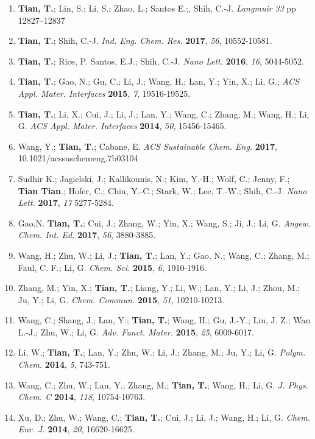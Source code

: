 \documentclass[margin]{res}
\begin{document}
\begin{resume}
\begin{enumerate}
  \item \textbf{Tian, T.}; Lin, S.; Li, S.; Zhao, L.; Santos E.;, Shih,
  C.-J. \textit{Langmuir} \textit{33} pp 12827–12837
  \item \textbf{Tian, T.}; Shih, C.-J. \textit{Ind. Eng. Chem. Res.} \textbf{2017}, \textit{56}, 10552-10581.
  \item \textbf{Tian, T.}; Rice, P. Santos, E.J.; Shih, C.-J. \textit{Nano Lett.} \textbf{2016}, \textit{16}, 5044-5052.
  \item \textbf{Tian, T.}; Gao, N.; Gu, C.; Li, J.; Wang, H.; Lan, Y.; Yin, X.; Li, G.; \textit{ACS Appl. Mater. Interfaces} \textbf{2015}, \textit{7}, 19516-19525.
  \item \textbf{Tian, T.}; Li, X.; Cui, J.; Li, J.; Lan, Y.; Wang, C.; Zhang, M.; Wang, H.; Li, G. \textit{ACS Appl. Mater. Interfaces} \textbf{2014}, \textit{50}, 15456-15465.
  \item Wang, Y.; \textbf{Tian, T.}; Cabane, E. \textit{ACS Sustainable Chem. Eng.} \textbf{2017}, 10.1021/acssuschemeng.7b03104
  \item Sudhir K.; Jagielski, J.; Kallikounis, N.; Kim, Y.-H.; Wolf, C.; Jenny, F.; \textbf{Tian Tian}.; Hofer, C.; Chiu, Y.-C.; Stark, W.; Lee, T.-W.; Shih, C.-J. \textit{Nano Lett.} \textbf{2017}, \textit{17} 5277-5284.
  \item Gao,N. \textbf{Tian, T.}; Cui, J.; Zhang, W.; Yin, X.; Wang,
    S.; Ji, J.; Li, G. \textit{Angew. Chem. Int. Ed.} \textbf{2017},
    \textit{56}, 3880-3885.
  \item Wang, H.; Zhu, W.; Li, J.; \textbf{Tian, T.}; Lan, Y.; Gao, N.; Wang, C.; Zhang, M.; Faul, C. F.; Li, G. \textit{Chem. Sci.} \textbf{2015}, \textit{6}, 1910-1916.
  \item Zhang, M.; Yin, X.; \textbf{Tian, T.}; Liang, Y.; Li, W.; Lan, Y.; Li, J.; Zhou, M.; Ju, Y.; Li, G. \textit{Chem. Commun.} \textbf{2015}, \textit{51}, 10210-10213.
  \item Wang, C.; Shang, J.; Lan, Y.; \textbf{Tian, T.}; Wang, H.; Gu, J.-Y.; Liu, J. Z.; Wan L.-J.; Zhu, W.; Li, G. \textit{Adv. Funct. Mater.} \textbf{2015}, \textit{25}, 6009-6017.
  \item Li, W.; \textbf{Tian, T.}; Lan, Y.; Zhu, W.; Li, J.; Zhang, M.; Ju, Y.; Li, G. \textit{Polym. Chem.} \textbf{2014}, \textit{5}, 743-751.
  \item Wang, C.; Zhu, W.; Lan, Y.; Zhang, M.; \textbf{Tian, T.}; Wang, H.; Li, G. \textit{J. Phys. Chem. C} \textbf{2014}, \textit{118}, 10754-10763.
  \item Xu, D.; Zhu, W.; Wang, C.; \textbf{Tian, T.}; Cui, J.; Li, J.; Wang, H.; Li, G. \textit{Chem. Eur. J.} \textbf{2014}, \textit{20}, 16620-16625.

\end{enumerate}
\end{resume}
\end{document}
